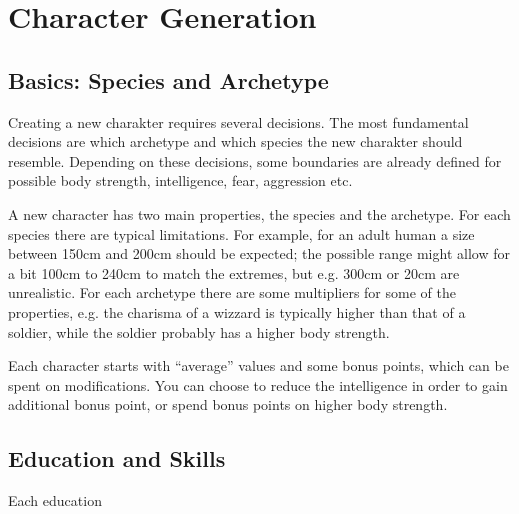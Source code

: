 \section{Character Generation}
\subsection{Basics: Species and Archetype}
Creating a new charakter requires several decisions. The most fundamental decisions are which archetype and which species the new charakter should resemble. Depending on these decisions, some boundaries are already defined for possible body strength, intelligence, fear, aggression etc.

A new character has two main properties, the species and the archetype. For each species there are typical limitations. For example, for an adult human a size between 150cm and 200cm should be expected; the possible range might allow for a bit 100cm to 240cm to match the extremes, but e.g. 300cm or 20cm are unrealistic. For each archetype there are some multipliers for some of the properties, e.g. the charisma of a wizzard is typically higher than that of a soldier, while the soldier probably has a higher body strength.

Each character starts with ``average'' values and some bonus points, which can be spent on modifications. You can choose to reduce the intelligence in order to gain additional bonus point, or spend bonus points on higher body strength.

\subsection{Education and Skills}
Each education 
